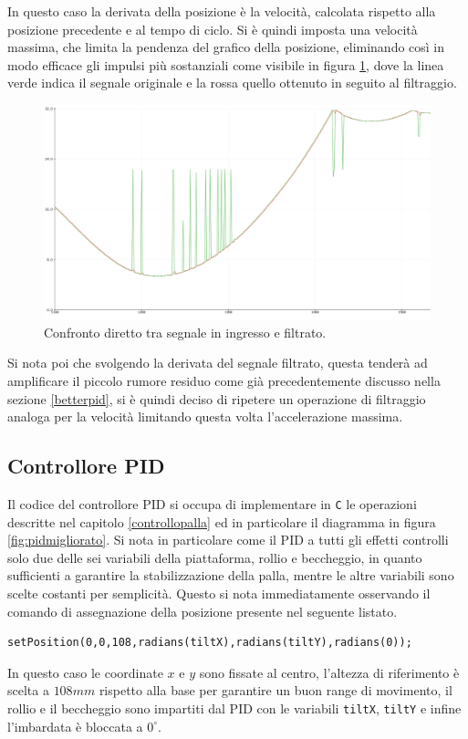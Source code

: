 \documentclass[12pt,twoside,openright]{report}
\begin{document}
In questo caso la derivata della posizione è la velocità, calcolata rispetto alla posizione precedente e al tempo di ciclo. Si è quindi imposta una velocità massima, che limita la pendenza del grafico della posizione, eliminando così in modo efficace gli impulsi più sostanziali come visibile in figura \ref{fig:filtraggioposizione}, dove la linea verde indica il segnale originale e la rossa quello ottenuto in seguito al filtraggio.
\begin{figure}[h!]
\centering
\includegraphics[width=\textwidth]{filtraggio2.png}
\caption{Confronto diretto tra segnale in ingresso e filtrato.} \label{fig:filtraggioposizione}
\end{figure}
Si nota poi che svolgendo la derivata del segnale filtrato, questa tenderà ad amplificare il piccolo rumore residuo come già precedentemente discusso nella sezione \ref{betterpid}, si è quindi deciso di ripetere un operazione di filtraggio analoga per la velocità limitando questa volta l'accelerazione massima.
\subsection{Controllore PID}
Il codice del controllore PID si occupa di implementare in \texttt{C} le operazioni descritte nel capitolo \ref{controllopalla} ed in particolare il diagramma in figura \ref{fig:pidmigliorato}.
Si nota in particolare come il PID a tutti gli effetti controlli solo due delle sei variabili della piattaforma, rollio e beccheggio, in quanto sufficienti a garantire la stabilizzazione della palla, mentre le altre variabili sono scelte costanti per semplicità.
Questo si nota immediatamente osservando il comando di assegnazione della posizione presente nel seguente listato.
\begin{verbatim}
setPosition(0,0,108,radians(tiltX),radians(tiltY),radians(0));
\end{verbatim}
In questo caso le coordinate $x$ e $y$ sono fissate al centro, l'altezza di riferimento è scelta a $108mm$ rispetto alla base per garantire un buon range di movimento, il rollio e il beccheggio sono impartiti dal PID con le variabili \texttt{tiltX},  \texttt{tiltY} e infine l'imbardata è bloccata a $0^\circ$.
\end{document}
